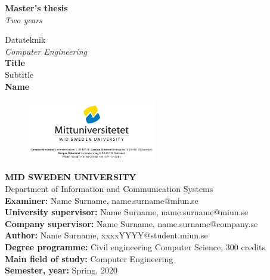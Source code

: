 \documentclass{report}
\begin{document}

\begin{titlepage}
\selectfont
\begin{tcolorbox}

\vspace{58ex}
\hspace*{6ex} \LARGE{\textbf{Master's thesis}}\\
\hspace*{3.2ex} \textit{\large{Two years}}\\
\vspace{4ex}



\hspace*{3.3ex} \normalsize{Datateknik}\\
\hspace*{6ex} \textit{Computer Engineering}\\


\hspace*{6ex} \textbf{Title}\\
\hspace*{6.2ex} Subtitle\\


\hspace*{6ex} \textbf{Name}\\
\vspace{10ex}
\end{tcolorbox}
\begin{figure}[h]
    \centering
    \includegraphics[width=0.5\textwidth,trim=4 4 4 4,clip]{Illustrations/miunlogo.png}
    \label{fig:my_label}
\end{figure}
\end{titlepage}
\restoregeometry
\vspace*{\fill}
\noindent\textbf{MID SWEDEN UNIVERSITY}\\
Department of Information and Communication Systems\\
\textbf{Examiner:} Name Surname, name.surname@miun.se\\
\textbf{University supervisor:} Name Surname, name.surname@miun.se\\
\textbf{Company supervisor:} Name Surname, name.surname@company.se\\
\textbf{Author:} Name Surname, xxxxYYYY@student.miun.se\\
\textbf{Degree programme:} Civil engineering Computer Science, 300 credits\\
\textbf{Main field of study:} Computer Engineering\\
\textbf{Semester, year:} Spring, 2020  \\
\newpage
{}
\begin{abstract}
    
\end{abstract}
\newpage
\end{document}
